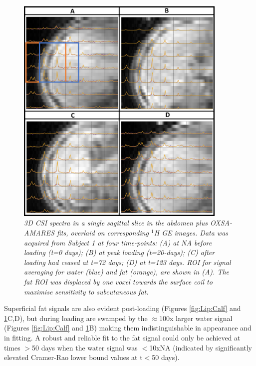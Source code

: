 \begin{figure}
    \centering
    \includegraphics[width=0.9\textwidth]{Figures/Lipid/Abdomen.png}
    \caption{\textit{3D \ac{CSI} spectra in a single sagittal slice in the abdomen plus OXSA-AMARES fits, overlaid on corresponding $^1$H \ac{GE} images. Data was acquired from Subject 1 at four time-points: (A) at NA before loading (t=0 days); (B) at peak loading (t=20-days); (C) after loading had ceased at t=72 days; (D) at t=123 days. \ac{ROI} for signal averaging for water (blue) and fat (orange), are shown in (A). The fat \ac{ROI} was displaced by one voxel towards the surface coil to maximise sensitivity to subcutaneous fat.}}
    \label{fig:Lip:Abdomen}
\end{figure}

Superficial fat signals are also evident post-loading (Figures \ref{fig:Lip:Calf} and \ref{fig:Lip:Abdomen}C,D), but during loading are swamped by the $\approx$100x larger water signal (Figures \ref{fig:Lip:Calf} and \ref{fig:Lip:Abdomen}B) making them indistinguishable in appearance and in fitting. A robust and reliable fit to the fat signal could only be achieved at times $>$50 days when the water signal was $<$10x\ac{NA} (indicated by significantly elevated Cramer-Rao lower bound values at t$<$50 days).

